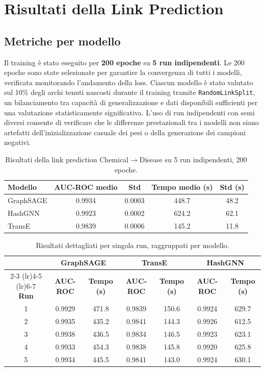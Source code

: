 \section{Risultati della Link Prediction}

\subsection{Metriche per modello}

Il training è stato eseguito per \textbf{200 epoche} su \textbf{5 run indipendenti}. Le 200 epoche sono state selezionate per garantire la convergenza di tutti i modelli, verificata monitorando l'andamento della loss. Ciascun modello è stato valutato sul 10\% degli archi tenuti nascosti durante il training tramite \texttt{RandomLinkSplit}, un bilanciamento tra capacità di generalizzazione e dati disponibili sufficienti per una valutazione statisticamente significativa. L'uso di run indipendenti con semi diversi consente di verificare che le differenze prestazionali tra i modelli non siano artefatti dell'inizializzazione casuale dei pesi o della generazione dei campioni negativi.

\begin{table}[ht!]
\centering
\small
\begin{tabular}{lcccc}
\toprule
\textbf{Modello} & \textbf{AUC-ROC medio} & \textbf{Std} & \textbf{Tempo medio (s)} & \textbf{Std (s)} \\
\midrule
GraphSAGE & 0.9934 & 0.0003 & 448.7 & 48.2 \\
HashGNN   & 0.9923 & 0.0002 & 624.2 & 62.1 \\
TransE    & 0.9839 & 0.0006 & 145.2 & 11.8 \\
\bottomrule
\end{tabular}
\caption{Risultati della link prediction Chemical$\to$Disease su 5 run indipendenti, 200 epoche.}
\label{tab:ml_results}
\end{table}

\begin{table}[ht!]
\centering
\small
\begin{tabular}{ccccccc}
\toprule
& \multicolumn{2}{c}{\textbf{GraphSAGE}} & \multicolumn{2}{c}{\textbf{TransE}} & \multicolumn{2}{c}{\textbf{HashGNN}} \\
\cmidrule(lr){2-3} \cmidrule(lr){4-5} \cmidrule(lr){6-7}
\textbf{Run} & \textbf{AUC-ROC} & \textbf{Tempo (s)} & \textbf{AUC-ROC} & \textbf{Tempo (s)} & \textbf{AUC-ROC} & \textbf{Tempo (s)} \\
\midrule
1 & 0.9929 & 471.8 & 0.9839 & 150.6 & 0.9924 & 629.7 \\
2 & 0.9935 & 435.2 & 0.9841 & 144.3 & 0.9926 & 612.5 \\
3 & 0.9938 & 436.5 & 0.9834 & 146.5 & 0.9923 & 623.1 \\
4 & 0.9933 & 454.3 & 0.9838 & 145.8 & 0.9920 & 625.8 \\
5 & 0.9934 & 445.5 & 0.9841 & 143.0 & 0.9924 & 630.1 \\
\bottomrule
\end{tabular}
\caption{Risultati dettagliati per singola run, raggruppati per modello.}
\label{tab:ml_results_detail}
\end{table}

